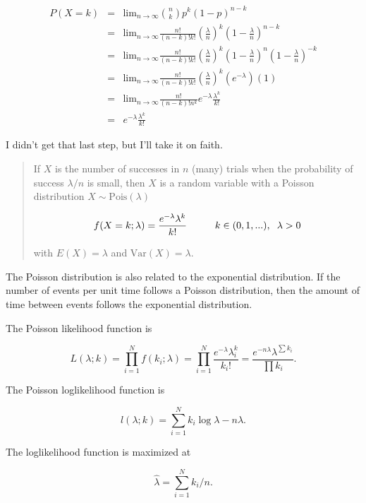 \documentclass[
]{book}
\begin{document}
\[\begin{eqnarray}
P(X = k) &=& \mathrm{lim}_{n \rightarrow \infty} {n \choose k}p^k(1-p)^{n-k}\\
&=& \mathrm{lim}_{n \rightarrow \infty} \frac{n!}{(n-k)!k!} \left(\frac{\lambda}{n}\right)^k \left(1-\frac{\lambda}{n}\right)^{n-k}\\
&=& \mathrm{lim}_{n \rightarrow \infty} \frac{n!}{(n-k)!k!} \left(\frac{\lambda}{n}\right)^k \left(1-\frac{\lambda}{n}\right)^n\left(1-\frac{\lambda}{n}\right)^{-k}\\
&=& \mathrm{lim}_{n \rightarrow \infty} \frac{n!}{(n-k)!k!} \left(\frac{\lambda}{n}\right)^k \left(e^{-\lambda}\right)(1)\\
&=& \mathrm{lim}_{n \rightarrow \infty} \frac{n!}{(n-k)!n^k}  e^{-\lambda}\frac{\lambda^k}{k!} \\
&=& e^{-\lambda}\frac{\lambda^k}{k!}
\end{eqnarray}\]

I didn't get that last step, but I'll take it on faith.

\begin{quote}
If \(X\) is the number of successes in \(n\) (many) trials when the probability of success \(\lambda / n\) is small, then \(X\) is a random variable with a Poisson distribution \(X \sim \mathrm{Pois}(\lambda)\)

\[f(X = k;\lambda) = \frac{e^{-\lambda} \lambda^k}{k!} \hspace{1cm} k \in (0, 1, ...), \hspace{2mm} \lambda > 0\]

with \(E(X)=\lambda\) and \(\mathrm{Var}(X) = \lambda\).
\end{quote}

The Poisson distribution is also related to the exponential distribution. If the number of events per unit time follows a Poisson distribution, then the amount of time between events follows the exponential distribution.

The Poisson likelihood function is

\[L(\lambda; k) = \prod_{i=1}^N f(k_i; \lambda) = \prod_{i=1}^N \frac{e^{-\lambda} \lambda^k_i}{k_i !} = \frac{e^{-n \lambda} \lambda^{\sum k_i}}{\prod k_i}.\]

The Poisson loglikelihood function is

\[l(\lambda; k) = \sum_{i=1}^N k_i \log \lambda - n \lambda.\]

The loglikelihood function is maximized at

\[\hat{\lambda} = \sum_{i=1}^N k_i / n.\]
\end{document}
